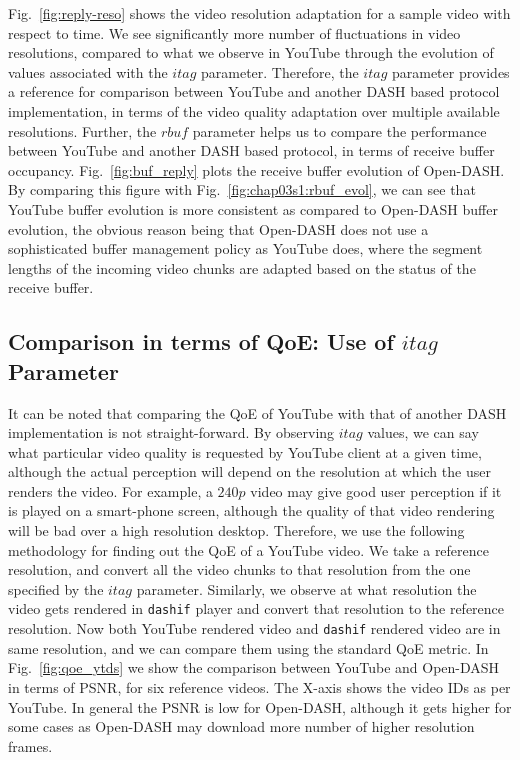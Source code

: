 Fig.~\ref{fig:reply-reso} shows the video resolution adaptation for a sample video with respect to time. We see significantly more number of fluctuations in video resolutions, compared to what we observe in YouTube through the evolution of values associated with the $itag$ parameter. Therefore, the $itag$ parameter provides a reference for comparison between YouTube and another DASH based protocol implementation, in terms of the video quality adaptation over multiple available resolutions. Further, the $rbuf$ parameter helps us to compare the performance between YouTube and another DASH based protocol, in terms of receive buffer occupancy. Fig.~\ref{fig:buf_reply} plots the receive buffer evolution of Open-DASH. By comparing this figure with Fig.~\ref{fig:chap03s1:rbuf_evol}, we can see that YouTube buffer evolution is more consistent as compared to Open-DASH buffer evolution, the obvious reason being that Open-DASH does not use a sophisticated buffer management policy as YouTube does, where the segment lengths of the incoming video chunks are adapted based on the status of the receive buffer.

% 
% 
\subsection{Comparison in terms of QoE: Use of $itag$ Parameter}

It can be noted that comparing the QoE of YouTube with that of another DASH implementation is not straight-forward. By observing $itag$ values, we can say what particular video quality is requested by YouTube client at a given time, although the actual perception will depend on the resolution at which the user renders the video. For example, a $240p$ video may give good user perception if it is played on a smart-phone screen, although the quality of that video rendering will be bad over a high resolution desktop. Therefore, we use the following methodology for finding out the QoE of a YouTube video. We take a reference resolution, and convert all the video chunks to that resolution from the one specified by the $itag$ parameter. Similarly, we observe at what resolution the video gets rendered in \texttt{dashif} player and convert that resolution to the reference resolution. Now both YouTube rendered video and \texttt{dashif} rendered video are in same resolution, and we can compare them using the standard QoE metric. In Fig.~\ref{fig:qoe_ytds} we show the comparison between YouTube and Open-DASH in terms of PSNR, for six reference videos. The X-axis shows the video IDs as per YouTube. In general the PSNR is low for Open-DASH, although it gets higher for some cases as Open-DASH may download more number of higher resolution frames. 

